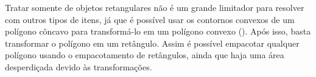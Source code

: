 Tratar somente de objetos retangulares não é um grande limitador para resolver com outros tipos
de itens, já que é possível usar os contornos convexos de um polígono côncavo para transformá-lo
em um polígono convexo ().
Após isso, basta transformar o polígono em um retângulo.
Assim é possível empacotar qualquer polígono usando o empacotamento de retângulos, ainda que
haja uma área desperdiçada devido às transformações.



